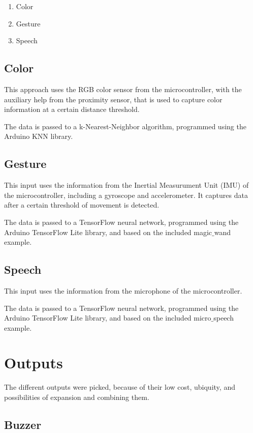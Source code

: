 \begin{enumerate}
  \item Color
  \item Gesture
  \item Speech
\end{enumerate}

\subsection{Color}

This approach uses the RGB color sensor from the microcontroller, with the auxiliary help from the proximity sensor, that is used to capture color information at a certain distance threshold.

The data is passed to a k-Nearest-Neighbor algorithm, programmed using the Arduino KNN library.

\subsection{Gesture}

This input uses the information from the Inertial Measurument Unit (IMU) of the microcontroller, including a gyroscope and accelerometer. It captures data after a certain threshold of movement is detected. 

The data is passed to a TensorFlow neural network, programmed using the Arduino TensorFlow Lite library, and based on the included magic$\_$wand example.

\subsection{Speech}

This input uses the information from the microphone of the microcontroller.

The data is passed to a TensorFlow neural network, programmed using the Arduino TensorFlow Lite library, and based on the included micro$\_$speech example.

\section{Outputs}

The different outputs were picked, because of their low cost, ubiquity, and possibilities of expansion and combining them.

\subsection{Buzzer}


